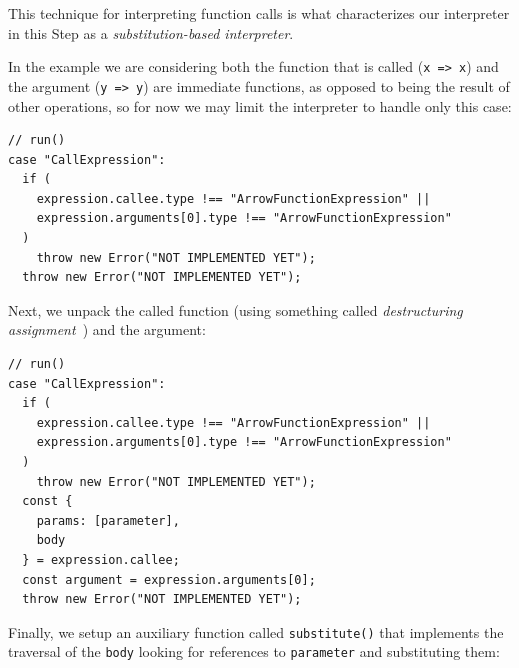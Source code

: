 \documentclass[12pt, oneside]{book}
\begin{document}
\begin{mdframed}[frametitle = {Technical Terms}]
This technique for interpreting function calls is what characterizes our interpreter in this Step as a \emph{substitution-based interpreter}.
\end{mdframed}

In the example we are considering both the function that is called (\texttt{x => x}) and the argument (\texttt{y => y}) are immediate functions, as opposed to being the result of other operations, so for now we may limit the interpreter to handle only this case:

\begin{verbatim}
// run()
case "CallExpression":
  if (
    expression.callee.type !== "ArrowFunctionExpression" ||
    expression.arguments[0].type !== "ArrowFunctionExpression"
  )
    throw new Error("NOT IMPLEMENTED YET");
  throw new Error("NOT IMPLEMENTED YET");
\end{verbatim}

Next, we unpack the called function (using something called \emph{destructuring assignment}~\cite{destructuring-assignment}) and the argument:

\begin{verbatim}
// run()
case "CallExpression":
  if (
    expression.callee.type !== "ArrowFunctionExpression" ||
    expression.arguments[0].type !== "ArrowFunctionExpression"
  )
    throw new Error("NOT IMPLEMENTED YET");
  const {
    params: [parameter],
    body
  } = expression.callee;
  const argument = expression.arguments[0];
  throw new Error("NOT IMPLEMENTED YET");
\end{verbatim}

Finally, we setup an auxiliary function called \texttt{substitute()} that implements the traversal of the \texttt{body} looking for references to \texttt{parameter} and substituting them:
\end{document}
